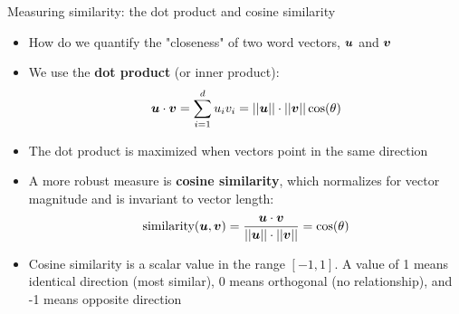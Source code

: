 \documentclass[aspectratio=169]{beamer}\usepackage[]{graphicx}\usepackage[]{xcolor}
\makeatletter
\newcommand{\defword}[1]{\textbf{\textcolor{beamer@blendedblue}{#1}}}
\makeatother
\begin{document}
\begin{frame}
\begin{center}
\end{center}
\end{frame}

\begin{frame}{Measuring similarity: the dot product and cosine similarity}
\begin{itemize}
\item How do we quantify the "closeness" of two word vectors, $\bm{u}$ and $\bm{v}$
\vfill
\item We use the \defword{dot product} (or inner product):
$$ \bm{u} \cdot \bm{v} = \sum_{i=1}^d u_i v_i = ||\bm{u}|| \cdot ||\bm{v}|| \cos(\theta) $$
\vfill
\item The dot product is maximized when vectors point in the same direction
\vfill
\item A more robust measure is \defword{cosine similarity}, which normalizes for vector magnitude and is invariant to vector length:
$$ \text{similarity}(\bm{u}, \bm{v}) = \frac{\bm{u} \cdot \bm{v}}{||\bm{u}|| \cdot ||\bm{v}||} = \cos(\theta) $$
\vfill
\item Cosine similarity is a scalar value in the range $[-1, 1]$. A value of 1 means identical direction (most similar), 0 means orthogonal (no relationship), and -1 means opposite direction
\end{itemize}
\end{frame}
\end{document}
